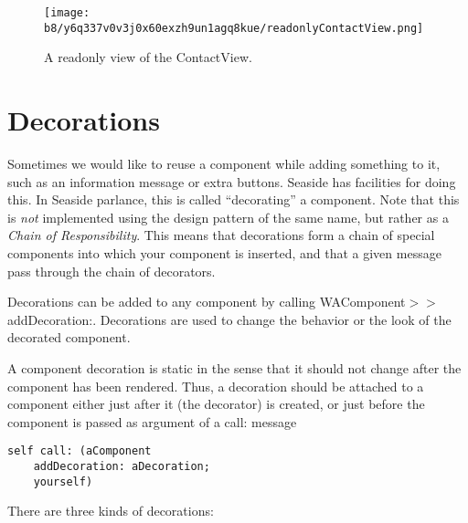 \documentclass[a4paper,10pt,twoside]{book}
\newcommand{\ct}[1]{{\small\ttfamily\textup{#1}}}
\begin{document}
\begin{figure}[h!tbp]
	\begin{center}
		\texttt{[image: b8/y6q337v0v3j0x60exzh9un1agq8kue/readonlyContactView.png]}
		\caption{A readonly view of the ContactView.\label{book:components:embedding:reuseing:readonlycontactview}}
	\end{center}
\end{figure}


\section{Decorations}
\label{book:components:embedding:decorations}

Sometimes we would like to reuse a component while adding something to it, such as an information message or extra buttons. Seaside has facilities for doing this. In Seaside parlance, this is called ``decorating'' a component. Note that this is \textit{not} implemented using the design pattern of the same name, but rather as a \textit{Chain of Responsibility}. This means that decorations form a chain of special components into which your component is inserted, and that a given message pass through the chain of decorators.

Decorations can be added to any component by calling  \ct{WAComponent$>$$>$addDecoration:}. Decorations are used to change the behavior or the look of the decorated component.

A component decoration is static in the sense that it should not change after the component has been rendered. Thus, a decoration should be attached to a component either just after it (the decorator) is created, or just before the component is passed as argument of a \ct{call:} message

\begin{lstlisting}
self call: (aComponent
    addDecoration: aDecoration; 
    yourself)
\end{lstlisting}

There are three kinds of decorations:
\end{document}
